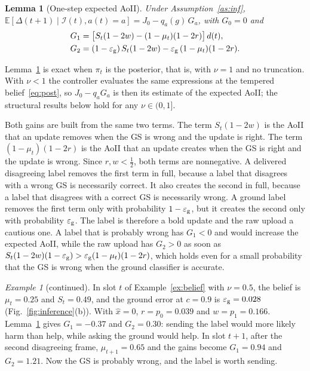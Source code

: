 \documentclass[5p,twocolumn]{elsarticle}
\newtheorem{lemma}{Lemma}
\theoremstyle{remark}
\newtheorem{example}{Example}
\newcommand{\E}{\mathbb{E}}
\newcommand{\I}{\mathcal{I}}
\newcommand{\ee}{\varepsilon}
\newcommand{\xh}{\hat{x}}
\begin{document}
\begin{lemma}[One-step expected AoII]\label{lem:onestep}
Under Assumption~\ref{as:inf}, $\E[\Delta(t+1)\mid\I(t),a(t)=a]=J_0-q_a(g)\,G_a$, with $G_0=0$ and
\begin{align}
G_1&=\big[S_t(1-2w)-(1-\mu_t)(1-2r)\big]\,d(t), \label{eq:G1}\\
G_2&=(1-\ee_{\rm g})\,S_t(1-2w)-\ee_{\rm g}\,(1-\mu_t)(1-2r). \label{eq:G2}
\end{align}
\end{lemma}

Lemma~\ref{lem:onestep} is exact when $\pi_t$ is the posterior, that is, with $\nu=1$ and no truncation. With $\nu<1$ the controller evaluates the same expressions at the tempered belief~\eqref{eq:post}, so $J_0-q_aG_a$ is then its estimate of the expected AoII; the structural results below hold for any $\nu\in(0,1]$.

Both gains are built from the same two terms. The term $S_t(1-2w)$ is the AoII that an update removes when the GS is wrong and the update is right. The term $(1-\mu_t)(1-2r)$ is the AoII that an update creates when the GS is right and the update is wrong. Since $r,w<\frac12$, both terms are nonnegative. A delivered disagreeing label removes the first term in full, because a label that disagrees with a wrong GS is necessarily correct. It also creates the second in full, because a label that disagrees with a correct GS is necessarily wrong. A ground label removes the first term only with probability $1-\ee_{\rm g}$, but it creates the second only with probability $\ee_{\rm g}$. The label is therefore a bold update and the raw upload a cautious one. A label that is probably wrong has $G_1<0$ and would increase the expected AoII, while the raw upload has $G_2>0$ as soon as $S_t(1-2w)(1-\ee_{\rm g})>\ee_{\rm g}(1-\mu_t)(1-2r)$, which holds even for a small probability that the GS is wrong when the ground classifier is accurate.

\setcounter{example}{0}
\begin{example}[continued]
In slot $t$ of Example~\ref{ex:belief} with $\nu=0.5$, the belief is $\mu_t=0.25$ and $S_t=0.49$, and the ground error at $c=0.9$ is $\ee_{\rm g}=0.028$ (Fig.~\ref{fig:inference}(b)). With $\xh=0$, $r=p_0=0.039$ and $w=p_1=0.166$. Lemma~\ref{lem:onestep} gives $G_1=-0.37$ and $G_2=0.30$: sending the label would more likely harm than help, while asking the ground would help. In slot $t+1$, after the second disagreeing frame, $\mu_{t+1}=0.65$ and the gains become $G_1=0.94$ and $G_2=1.21$. Now the GS is probably wrong, and the label is worth sending.
\end{example}
\end{document}
